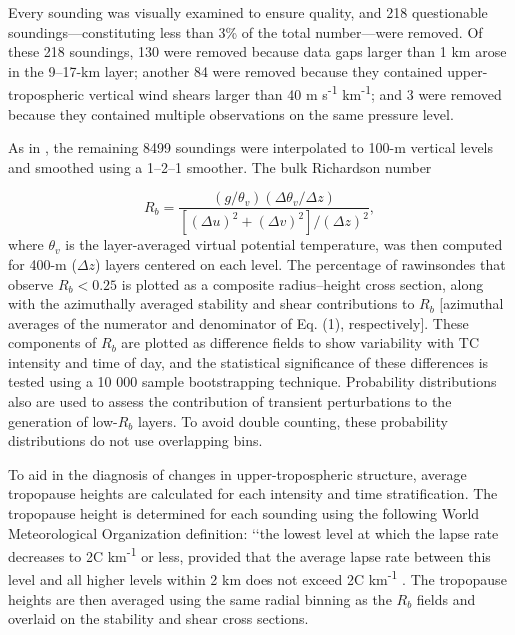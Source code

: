 Every sounding was visually examined to ensure quality, and 218 questionable soundings---constituting less than 3\% of the total number---were removed.
Of these 218 soundings, 130 were removed because data gaps larger than 1 km arose in the 9--17-km layer; another 84 were removed because they contained upper-tropospheric  vertical  wind shears larger than 40 m s\textsuperscript{-1} km\textsuperscript{-1}; and 3 were removed because they contained multiple observations on the same pressure level.

As in \cite{Molinarietal2014}, the remaining 8499 soundings were interpolated to 100-m vertical levels and smoothed using a 1–2–1 smoother.
The bulk Richardson number

   \begin{equation} \label{eq:rb}
   R_b = \frac{(g/\theta_v)(\Delta\theta_v/\Delta z)}{[(\Delta u)^2+(\Delta v)^2]/(\Delta z)^2},
   \end {equation}
where $\theta_v$ is the layer-averaged virtual potential temperature, was then computed for 400-m ($\Delta z$) layers centered on each level.
The percentage of rawinsondes that observe $R_b < 0.25$ is plotted as a composite radius--height cross section, along with the azimuthally averaged stability and shear contributions to $R_b$ [azimuthal averages of the numerator and denominator of Eq. (1), respectively].
These components of $R_b$ are plotted as difference fields to show variability with TC intensity and time of day, and the statistical significance of these differences is tested using a 10 000 sample bootstrapping technique.
Probability distributions also are used to assess the contribution of transient perturbations to the generation of low-$R_b$ layers.
To avoid double counting, these probability distributions do not use overlapping bins.

To  aid  in  the  diagnosis  of  changes  in  upper-tropospheric structure, average tropopause heights are calculated for each intensity and time stratification.
The tropopause height is determined for each sounding using the following World Meteorological Organization definition: ‘‘the lowest level at which the lapse rate decreases to 2\textdegree{}C km\textsuperscript{-1} or less, provided that the average lapse rate between this level and all higher levels within 2 km does not exceed 2\textdegree{}C km\textsuperscript{-1} \citep{WMO1957}.
The tropopause heights are then averaged using the same radial binning as the $R_b$ fields and overlaid on the stability and shear cross sections.


